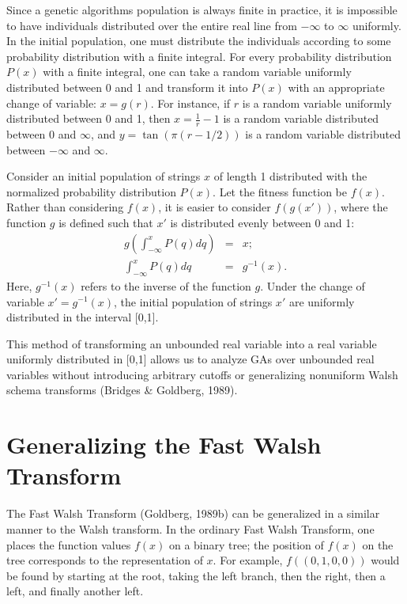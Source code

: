 Since a genetic algorithms population is always finite in practice, it is
impossible to have individuals distributed over the entire real line from 
$-\infty$ to $\infty$ uniformly.  In the initial population, one must
distribute the individuals according to some probability distribution with
a finite integral.  For every probability distribution $P(x)$ with a finite
integral, one can take a random variable uniformly distributed between 0 and 1
 and
transform it into $P(x)$ with an appropriate change of variable:
$x=g(r)$.
For instance, if $r$ is a random variable uniformly distributed between
0 and 1, then $x=\frac{1}{r}-1$ is a random variable distributed between
0 and $\infty$, and $y=\tan(\pi(r-1/2))$ is a random variable distributed
between $-\infty$ and $\infty$.

\begin{example}
Consider an initial population of \inftyary strings $x$ of length 1 distributed
with the normalized
probability distribution $P(x)$.  Let the fitness function be $f(x)$.
Rather than considering $f(x)$, it is easier to consider $f(g(x'))$, where
the function $g$ is defined such that $x'$ is distributed evenly between
0 and 1:
\begin{eqnarray}
g(\int_{-\infty}^x P(q) dq)&=& x; \nonumber\\
\int_{-\infty}^x P(q) dq&=& g^{-1}(x).
\end{eqnarray}
Here, $g^{-1}(x)$ refers to the inverse of the function $g$.
Under the change of variable $x'=g^{-1}(x)$, the initial population of 
strings $x'$ are uniformly distributed in the interval [0,1].
\end{example}

This method of transforming an unbounded real variable into a
real variable uniformly distributed in [0,1] allows us to analyze
GAs over unbounded real variables without introducing arbitrary
cutoffs or generalizing nonuniform Walsh schema transforms
(Bridges \& Goldberg, 1989).

\section{Generalizing the Fast Walsh Transform}
The Fast Walsh Transform (Goldberg, 1989b) can be generalized in a similar 
manner to the Walsh transform.
In the ordinary Fast Walsh Transform, one places the function values $f(x)$ on a
binary tree; the position of $f(x)$ on the tree corresponds to the
representation of $x$.  For example, $f((0,1,0,0))$ would be found by
starting at the root, taking the left branch, then the right, then a
left, and finally another left.

